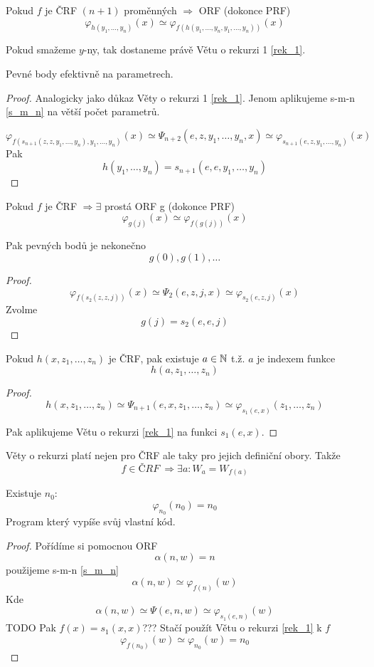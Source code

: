 \begin{theorem}[O rekurzi 2]
	Pokud $f$ je ČRF $(n + 1)$ proměnných $\Rightarrow$ ORF (dokonce PRF)
	\[ \varphi_{h(y_1, \ldots, y_n)}(x) \simeq \varphi_{f(h(y_1, \ldots, y_n, y_1, \ldots, y_n))} (x) \]

	Pokud smažeme $y$-ny, tak dostaneme právě Větu o rekurzi 1 \cref{rek_1}.

	Pevné body efektivně na parametrech.
\end{theorem}
\begin{proof}
	Analogicky jako důkaz Věty o rekurzi 1 \cref{rek_1}.
	Jenom aplikujeme s-m-n \cref{s_m_n} na větší počet parametrů.

	\[ \varphi_{f(s_{n + 1}(z, z, y_1, \ldots, y_n), y_1, \ldots, y_n)} (x) \simeq \Psi_{n + 2}(e, z, y_1, \ldots, y_n, x) \simeq \varphi_{s_{n+1}(e, z, y_1, \ldots, y_n)} (x) \]
	Pak
	\[ h(y_1, \ldots, y_n) = s_{n+1}(e, e, y_1, \ldots, y_n) \]
\end{proof}

\begin{theorem}
	Pokud $f$ je ČRF $\Rightarrow \exists$ prostá ORF g (dokonce PRF)
	\[ \varphi_{g(j)}(x) \simeq \varphi_{f(g(j))} (x) \]

	Pak pevných bodů je nekonečno
	\[ g(0), g(1), \ldots \]
\end{theorem}
\begin{proof}
	\[ \varphi_{f(s_2(z, z, j))} (x) \simeq \Psi_2(e, z, j, x) \simeq \varphi_{s_2(e, z, j)} (x) \]
	Zvolme
	\[ g(j) = s_2(e, e, j) \]
\end{proof}

\begin{theorem}[O rekurzi 3]
	Pokud $h(x, z_1, \ldots, z_n)$ je ČRF, pak existuje $a \in \operatorname{\mathbb{N}}$ t.ž. $a$ je indexem funkce
	\[ h(a, z_1, \ldots, z_n) \]
\end{theorem}
\begin{proof}
	\[ h(x, z_1, \ldots, z_n) \simeq \Psi_{n + 1}(e, x, z_1, \ldots, z_n) \simeq \varphi_{s_1(e, x)} (z_1, \ldots, z_n) \]

	Pak aplikujeme Větu o rekurzi \cref{rek_1} na funkci $s_1(e, x)$.
\end{proof}

\begin{note}
	Věty o rekurzi platí nejen pro ČRF ale taky pro jejich definiční obory.
	Takže
	\[ f \in ČRF\ \Rightarrow \exists a: W_a = W_{f(a)} \]
\end{note}

\begin{theorem}
	Existuje $n_0$:
	\[ \varphi_{n_0} (n_0) = n_0 \]
	Program který vypíše svůj vlastní kód.
\end{theorem}
\begin{proof}
	Pořídíme si pomocnou ORF
	\[ \alpha(n, w) = n \]
	použijeme s-m-n \cref{s_m_n}
	\[ \alpha(n, w) \simeq \varphi_{f(n)} (w) \]
	Kde
	\[ \alpha(n, w) \simeq \Psi(e, n, w) \simeq \varphi_{s_1(e, n)} (w)  \]
	TODO Pak $f(x) = s_1(x, x)$???
	Stačí použít Větu o rekurzi \cref{rek_1} k $f$
	\[ \varphi_{f(n_0)} (w) \simeq \varphi_{n_0} (w) = n_0 \]
\end{proof}

